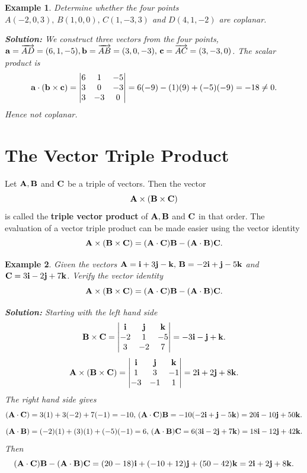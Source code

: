 \documentclass[titlepage,a4paper,12pt]{report}
\newtheorem{example}{Example}[section]
\begin{document}
\begin{example}
Determine whether the four points $A(-2, 0, 3), \, B(1,0,0), \, C(1,-3,3)$ and $D(4,1,-2)$ are coplanar.

\noindent \textbf{Solution:} We construct three vectors from the four points, ${\bf{a}}=\overrightarrow{AD}=(6,1,-5),\\ {\bf{b}}=\overrightarrow{AB}=(3,0,-3), \, {\bf{c}}=\overrightarrow{AC}=(3,-3,0)$. The scalar product is  
\[{\bf{a}\cdot ( {\bf{b}\times \bf{c}}})=\begin{vmatrix}
6 & 1 & -5 \\
3 & 0 & -3 \\
3 & -3 & 0
\end{vmatrix} =6(-9)-(1)(9)+(-5)(-9)=-18 \neq 0.\] Hence not coplanar.
\end{example}
\section{The Vector Triple Product}
Let ${\bf{A}}, {\bf{B}}$ and ${\bf{C}}$ be a triple of vectors. Then the vector 
\[{\bf{A}\times ({\bf{B}\times \bf{C}})}\] is called the \textbf{triple vector product} of ${\bf{A}}, {\bf{B}}$ and ${\bf{C}}$ in that order. The evaluation of a vector triple product can be made easier using the vector identity
\[{\bf{A}\times ({\bf{B}\times \bf{C}})}=({\bf{A\cdot \bf{C}}}){\bf{B}}-({\bf{A\cdot \bf{B}}}){\bf{C}}.\]
\begin{example}
 Given the vectors ${\bf{A}}={\bf{i}}+3{\bf{j}}-{\bf{k}}, \,{\bf{B}}=-2{\bf{i}}+{\bf{j}}-5{\bf{k}} $ and ${\bf{C}}=3{\bf{i}}-2{\bf{j}}+7{\bf{k}}$. Verify the vector identity 
 \[{\bf{A}\times ({\bf{B}\times \bf{C}})}=({\bf{A\cdot \bf{C}}}){\bf{B}}-({\bf{A\cdot \bf{B}}}){\bf{C}}.\]
 
 \noindent \textbf{Solution:} Starting with the left hand side 
 \[{\bf{B}\times \bf{C}}=\begin{vmatrix}
 {\bf{i}} & {\bf{j}} & {\bf{k}} \\
 -2 & 1 & -5 \\
 3 & -2 & 7 
 \end{vmatrix}  =-3 {\bf{i}}-{\bf{j}}+{\bf{k}}.\]
 \[{\bf{A}\times ({\bf{B}\times \bf{C}})} =\begin{vmatrix}
 {\bf{i}} & {\bf{j}} & {\bf{k}} \\
 1 & 3 & -1 \\
 -3 & -1 & 1 
 \end{vmatrix}  =2{\bf{i}}+2{\bf{j}}+8{\bf{k}}.\] The right hand side gives 
 \[({\bf{A\cdot \bf{C}}})=3(1)+3(-2)+7(-1)=-10, \, ({\bf{A\cdot C}}){\bf{B}}=-10(-2{\bf{i}}+{\bf{j}}-5{\bf{k}})=20{\bf{i}}-10{\bf{j}}+50{\bf{k}}.\]
 \[({\bf{A\cdot \bf{B}}})=(-2)(1)+(3)(1)+(-5)(-1)=6, \, ({\bf{A\cdot B}}){\bf{C}} = 6(3{\bf{i}}-2{\bf{j}}+7{\bf{k}})=18{\bf{i}}-12{\bf{j}}+42{\bf{k}}.\] Then 
 \[({\bf{A\cdot \bf{C}}}){\bf{B}}-({\bf{A\cdot \bf{B}}}){\bf{C}} =(20-18){\bf{i}}+(-10+12){\bf{j}}+(50-42){\bf{k}}=2{\bf{i}}+2{\bf{j}}+8{\bf{k}}.\]
\end{example}
\end{document}
